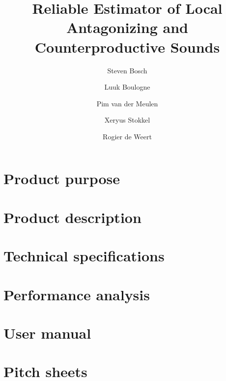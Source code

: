 \documentclass[a4paper]{article}
\title{Reliable Estimator of Local Antagonizing and Counterproductive Sounds}
\author{Steven Bosch \and Luuk Boulogne \and Pim van der Meulen \and Xeryus Stokkel  \and Rogier de Weert}
\begin{document}
\maketitle

\section{Product purpose}

\section{Product description}

\section{Technical specifications}

\section{Performance analysis}

\section{User manual}

\section{Pitch sheets}
\end{document}
